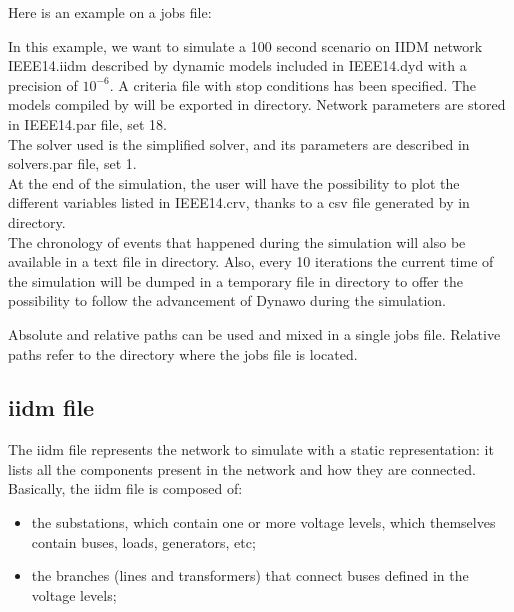 \documentclass[a4paper, 12pt]{report}
\begin{document}
Here is an example on a jobs file:


In this example, we want to simulate a 100 second scenario on IIDM network
IEEE14.iidm described by dynamic models included in IEEE14.dyd with a precision
of $10^{-6}$. A criteria file with stop conditions has been specified.
The models compiled by \Dynawo will be exported in  directory. Network parameters are stored in IEEE14.par file, set 18. \\

The solver used is the simplified solver, and its parameters are described in solvers.par file, set 1. \\

At the end of the simulation, the user will have the possibility to plot the different variables listed in IEEE14.crv, thanks to a csv file generated by \Dynawo in  directory. \\

The chronology of events that happened during the simulation will also be
available in a text file in  directory. Also, every 10
iterations the current time of the simulation will be dumped in a
temporary file in  directory to offer the possibility to follow the advancement of Dynawo during the simulation.

Absolute and relative paths can be used and mixed in a single jobs file. Relative paths refer to the directory where the jobs file is located.

\subsection{iidm file}

The iidm file represents the network to simulate with a static representation: it lists all the components present in the network and how they are connected. \\

Basically, the iidm file is composed of:
\begin{itemize}
\item the substations, which contain one or more voltage levels, which themselves contain buses, loads, generators, etc;
\item the branches (lines and transformers) that connect buses defined in the voltage levels;
\end{itemize}
\end{document}
